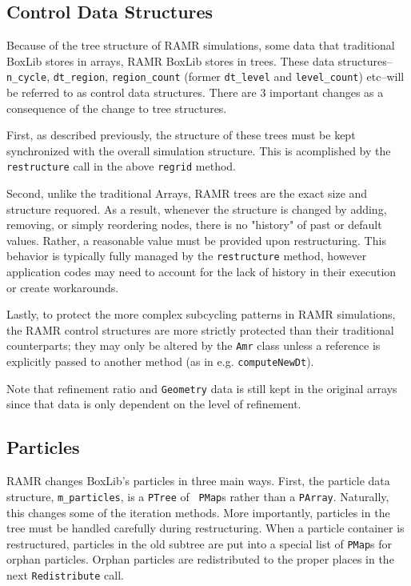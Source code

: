\documentclass[11pt]{article}
\begin{document}
\subsection{Control Data Structures}

Because of the tree structure of RAMR simulations, some data that 
traditional BoxLib stores in arrays, RAMR BoxLib stores in trees. These 
data structures--{\tt n\_cycle}, {\tt dt\_region}, {\tt region\_count} (former 
{\tt dt\_level} and {\tt level\_count}) etc--will be referred to as 
control data structures. There are 3 important changes as a 
consequence of the change to tree structures.

First, as described previously, the structure of these trees must be 
kept synchronized with the overall simulation structure. This is 
acomplished by the {\tt restructure} call in the above {\tt regrid} 
method. 

Second, unlike the traditional Arrays, RAMR trees are the exact size 
and structure requored. As a result, whenever the structure is changed 
by adding, removing, or simply reordering nodes, there is no "history" 
of past or default values. Rather, a reasonable value must be provided 
upon restructuring. This behavior is typically fully managed by the 
{\tt restructure} method, however application codes may need to account for 
the lack of history in their execution or create workarounds.

Lastly, to protect the more complex subcycling patterns in RAMR 
simulations, the RAMR control structures are more strictly protected 
than their traditional counterparts; they may only be altered by the 
{\tt Amr} class unless a reference is explicitly passed to another 
method (as in e.g. {\tt computeNewDt}).

Note that refinement ratio and {\tt Geometry} data is still kept in 
the original arrays since that data is only dependent on the level of 
refinement.

\subsection{Particles}

RAMR changes BoxLib's particles in three main ways. First, the 
particle data structure, {\tt m\_particles}, is a {\tt PTree} of {\tt 
PMap}s rather than a {\tt PArray}. Naturally, this changes some of the 
iteration methods. More importantly, particles in the tree must be 
handled carefully during restructuring. When a particle container is 
restructured, particles in the old subtree are put into a special list 
of {\tt PMap}s for orphan particles. Orphan particles are 
redistributed to the proper places in the next {\tt Redistribute} 
call. 
\end{document}
